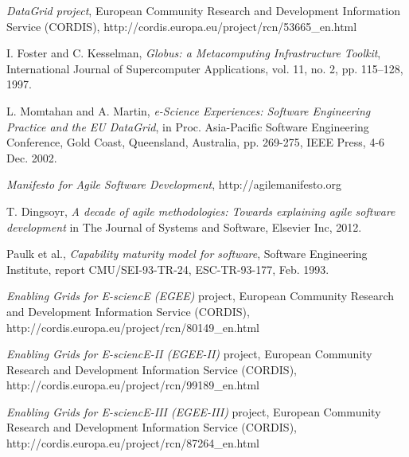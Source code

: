 \documentclass[journal]{IEEEtran}
\begin{document}
%
%
%
\begin{thebibliography}{1}

\emph{DataGrid project}, European Community Research and Development
Information Service (CORDIS),
http://cordis.europa.eu/project/rcn/53665\_en.html

I. Foster and C. Kesselman, \emph{Globus: a Metacomputing Infrastructure
Toolkit}, International Journal of Supercomputer Applications, vol. 11, no. 2,
pp. 115–128, 1997.

L. Momtahan and A. Martin, \emph{e-Science Experiences: Software Engineering
Practice and the EU DataGrid}, in Proc. Asia-Pacific Software Engineering
Conference, Gold Coast, Queensland, Australia, pp. 269-275, IEEE Press,
4-6 Dec. 2002.

\emph{Manifesto for Agile Software Development}, http://agilemanifesto.org

T. Dingsoyr, \emph{A decade of agile methodologies: Towards explaining agile
software development} in The Journal of Systems and Software, Elsevier Inc,
2012.

Paulk et al., \emph{Capability maturity model for software}, Software
Engineering Institute, report CMU/SEI-93-TR-24, ESC-TR-93-177, Feb. 1993.

\emph{Enabling Grids for E-sciencE (EGEE)} project, European Community
Research and Development Information Service (CORDIS),
http://cordis.europa.eu/project/rcn/80149\_en.html

\emph{Enabling Grids for E-sciencE-II (EGEE-II)} project, European Community
Research and Development Information Service (CORDIS),
http://cordis.europa.eu/project/rcn/99189\_en.html

\emph{Enabling Grids for E-sciencE-III (EGEE-III)} project, European Community
Research and Development Information Service (CORDIS),
http://cordis.europa.eu/project/rcn/87264\_en.html


\end{thebibliography}
\end{document}
